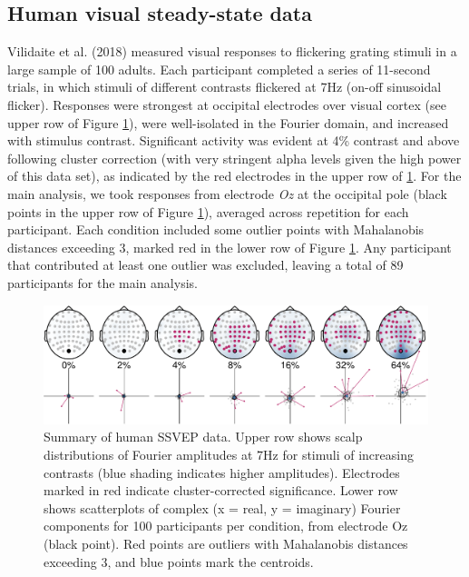 \documentclass[]{article}
\begin{document}
\hypertarget{human-visual-steady-state-data}{%
\subsection{Human visual steady-state data}\label{human-visual-steady-state-data}}

Vilidaite et al. (2018) measured visual responses to flickering grating stimuli in a large sample of 100 adults. Each participant completed a series of 11-second trials, in which stimuli of different contrasts flickered at 7Hz (on-off sinusoidal flicker). Responses were strongest at occipital electrodes over visual cortex (see upper row of Figure \ref{fig:humanSSVEP}), were well-isolated in the Fourier domain, and increased with stimulus contrast. Significant activity was evident at 4\% contrast and above following cluster correction (with very stringent alpha levels given the high power of this data set), as indicated by the red electrodes in the upper row of \ref{fig:humanSSVEP}. For the main analysis, we took responses from electrode \emph{Oz} at the occipital pole (black points in the upper row of Figure \ref{fig:humanSSVEP}), averaged across repetition for each participant. Each condition included some outlier points with Mahalanobis distances exceeding 3, marked red in the lower row of Figure \ref{fig:humanSSVEP}. Any participant that contributed at least one outlier was excluded, leaving a total of 89 participants for the main analysis.

\begin{figure}

{\centering \includegraphics{manuscript_files/figure-latex/humanSSVEP-1} 

}

\caption{Summary of human SSVEP data. Upper row shows scalp distributions of Fourier amplitudes at 7Hz for stimuli of increasing contrasts (blue shading indicates higher amplitudes). Electrodes marked in red indicate cluster-corrected significance.  Lower row shows scatterplots of complex (x = real, y = imaginary) Fourier components for 100 participants per condition, from electrode Oz (black point). Red points are outliers with Mahalanobis distances exceeding 3, and blue points mark the centroids.}\label{fig:humanSSVEP}
\end{figure}
\end{document}
